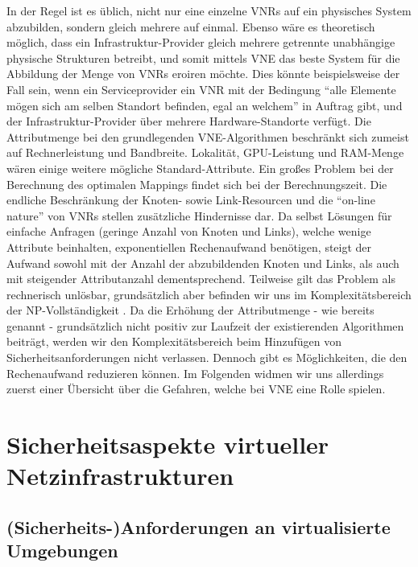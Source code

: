 \documentclass{lni}
\begin{document}
In der Regel ist es üblich, nicht nur eine einzelne VNRs auf ein physisches System abzubilden, sondern gleich mehrere auf einmal. Ebenso wäre es theoretisch möglich, dass ein Infrastruktur-Provider gleich mehrere getrennte unabhängige physische Strukturen betreibt, und somit mittels VNE das beste System für die Abbildung der Menge von VNRs eroiren möchte. Dies könnte beispielsweise der Fall sein, wenn ein Serviceprovider ein VNR mit der Bedingung "`alle Elemente mögen sich am selben Standort befinden, egal an welchem"' in Auftrag gibt, und der Infrastruktur-Provider über mehrere Hardware-Standorte verfügt.
\newline
Die Attributmenge bei den grundlegenden VNE-Algorithmen beschränkt  sich zumeist auf Rechnerleistung und Bandbreite. 
Lokalität, GPU-Leistung und RAM-Menge wären einige weitere mögliche Standard-Attribute. Ein großes Problem bei der Berechnung des optimalen Mappings findet sich bei der Berechnungszeit. Die endliche Beschränkung der Knoten- sowie Link-Resourcen und die "`on-line nature"' von VNRs stellen zusätzliche Hindernisse dar. Da selbst Lösungen für einfache Anfragen (geringe Anzahl von Knoten und Links), welche wenige Attribute beinhalten, exponentiellen Rechenaufwand benötigen, steigt der Aufwand sowohl mit der Anzahl der abzubildenden Knoten und Links, als auch mit steigender Attributanzahl dementsprechend. Teilweise gilt das Problem als rechnerisch unlösbar, grundsätzlich aber befinden wir uns im Komplexitätsbereich der NP-Vollständigkeit \cite{SVNE2}. Da die Erhöhung der Attributmenge - wie bereits genannt - grundsätzlich nicht positiv zur Laufzeit der existierenden Algorithmen beiträgt, werden wir den Komplexitätsbereich beim Hinzufügen von Sicherheitsanforderungen nicht verlassen. Dennoch gibt es Möglichkeiten, die den Rechenaufwand reduzieren können. Im Folgenden widmen wir uns allerdings zuerst einer Übersicht über die Gefahren, welche bei VNE eine Rolle spielen.



\section{Sicherheitsaspekte virtueller Netzinfrastrukturen}
\label{sec:gefahren}

\subsection{(Sicherheits-)Anforderungen an virtualisierte Umgebungen}
\label{subsec:gefahren_anforderungen}

\end{document}
